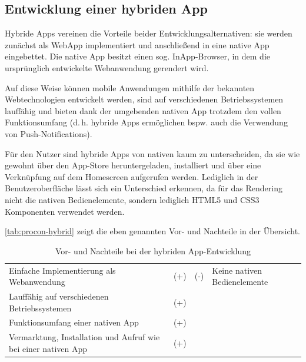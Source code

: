 \subsection{Entwicklung einer hybriden App}
Hybride Apps vereinen die Vorteile beider Entwicklungsalternativen: sie werden zunächst als WebApp implementiert und anschließend in eine native App eingebettet. Die native App besitzt einen sog. InApp-Browser, in dem die ursprünglich entwickelte Webanwendung gerendert wird.

Auf diese Weise können mobile Anwendungen mithilfe der bekannten Webtechnologien entwickelt werden, sind auf verschiedenen Betriebssystemen lauffähig und bieten dank der umgebenden nativen App trotzdem den vollen Funktionsumfang (d.\,h. hybride Apps ermöglichen bspw. auch die Verwendung von Push-Notifications).

Für den Nutzer sind hybride Apps von nativen kaum zu unterscheiden, da sie wie gewohnt über den App-Store heruntergeladen, installiert und über eine Verknüpfung auf dem Homescreen aufgerufen werden. Lediglich in der Benutzeroberfläche lässt sich ein Unterschied erkennen, da für das Rendering nicht die nativen Bedienelemente, sondern lediglich HTML5 und CSS3 Komponenten verwendet werden.

\vref*{tab:procon-hybrid} zeigt die eben genannten Vor- und Nachteile in der Übersicht.

\begin{table}[H]
  \begin{center}\small\renewcommand{\arraystretch}{1.4}\sffamily %
    \begin{tabulary}{\textwidth}{>{\raggedleft}m{61mm} *{2}{>{\ttfamily}m{5mm}} m{61mm}}
    	&	\\ \hline
    
    Einfache Implementierung als Webanwendung & (+) &
    (-) & Keine nativen Bedienelemente\\
    
    Lauffähig auf verschiedenen Betriebssystemen & (+) & & \\
    
    Funktionsumfang einer nativen App & (+) & & \\
    
    Vermarktung, Installation und Aufruf wie bei einer nativen App & (+) & &\\

    \end{tabulary}        
    
    \caption{Vor- und Nachteile bei der hybriden App-Entwicklung}
    \label{tab:procon-hybrid}
  \end{center}
\end{table}

